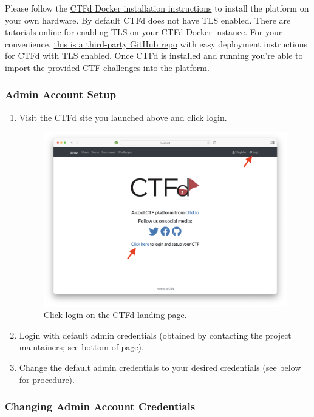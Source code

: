 \documentclass[11pt]{article}
\begin{document}
Please follow the \href{https://docs.ctfd.io/docs/deployment/installation#docker}{CTFd Docker installation instructions} to install the platform on your own hardware.
By default CTFd does not have TLS enabled.
There are tutorials online for enabling TLS on your CTFd Docker instance.
For your convenience, \href{https://github.com/tghosth/CTFd-docker-deploy}{this is a third-party GitHub repo} with easy deployment instructions for CTFd with TLS enabled.
Once CTFd is installed and running you're able to import the provided CTF challenges into the platform.

\subsubsection{Admin Account Setup}

\begin{enumerate}
	\item Visit the CTFd site you launched above and click login.
   \begin{figure}[H]
		\centering
	   \includegraphics[width=\textwidth]{ctfd_landing_page.png}
  	   \caption{Click login on the CTFd landing page.}
	\end{figure}
	\item Login with default admin credentials (obtained by contacting the project maintainers; see bottom of page).
	\item Change the default admin credentials to your desired credentials (see below for procedure).
\end{enumerate}

\subsubsection{Changing Admin Account Credentials}
\end{document}
